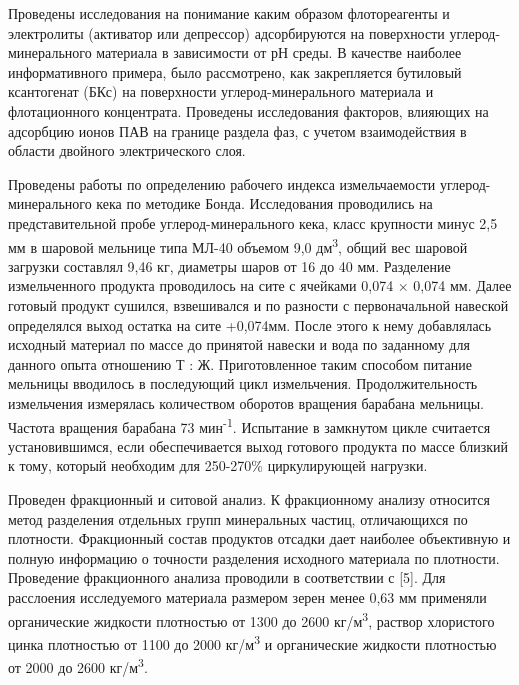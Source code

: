 \begin{multicols}{2}
Проведены исследования на понимание каким образом флотореагенты и
электролиты (активатор или депрессор) адсорбируются на поверхности
углерод-минерального материала в зависимости от рН среды. В качестве
наиболее информативного примера, было рассмотрено, как закрепляется
бутиловый ксантогенат (БКс) на поверхности углерод-минерального
материала и флотационного концентрата. Проведены исследования факторов,
влияющих на адсорбцию ионов ПАВ на границе раздела фаз, с учетом
взаимодействия в области двойного электрического слоя.

Проведены работы по определению рабочего индекса измельчаемости
углерод-минерального кека по методике Бонда. Исследования проводились на
представительной пробе углерод-минерального кека, класс крупности минус
2,5 мм в шаровой мельнице типа МЛ-40 объемом 9,0 дм\textsuperscript{3},
общий вес шаровой загрузки составлял 9,46 кг, диаметры шаров от 16 до 40
мм. Разделение измельченного продукта проводилось на сите с ячейками
0,074 × 0,074 мм. Далее готовый продукт сушился, взвешивался и по
разности с первоначальной навеской определялся выход остатка на сите
+0,074мм. После этого к нему добавлялась исходный материал по массе до
принятой навески и вода по заданному для данного опыта отношению Т : Ж.
Приготовленное таким способом питание мельницы вводилось в последующий
цикл измельчения. Продолжительность измельчения измерялась количеством
оборотов вращения барабана мельницы. Частота вращения барабана 73
мин\textsuperscript{-1}. Испытание в замкнутом цикле считается
установившимся, если обеспечивается выход готового продукта по массе
близкий к тому, который необходим для 250-270\% циркулирующей нагрузки.

Проведен фракционный и ситовой анализ. К фракционному анализу относится
метод разделения отдельных групп минеральных ча­стиц, отличающихся по
плотности. Фракцион­ный состав продуктов отсадки дает наиболее
объективную и полную информацию о точности разделения исходного
мате­риала по плотности. Проведение фракционного анализа проводили в
соответствии с {[}5{]}. Для расслоения исследуемого материала размером
зерен менее 0,63 мм применяли органические жидкости плотностью от 1300
до 2600 кг/м\textsuperscript{3}, раствор хлористого цинка плотностью от
1100 до 2000 кг/м\textsuperscript{3} и органические жидкости плотностью
от 2000 до 2600 кг/м\textsuperscript{3}.


\end{multicols}
